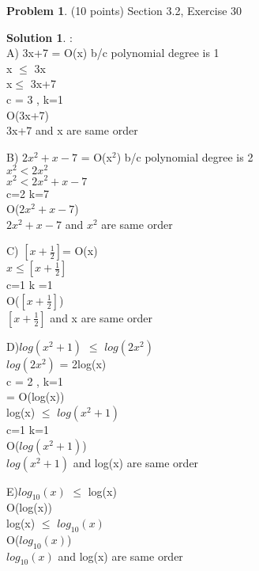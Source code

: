 \documentclass{article}
\theoremstyle{definition}
\newtheorem{problem}{Problem}
\newtheorem*{solution}{Solution}
\begin{document}
\newpage


\begin{problem} (10 points) Section 3.2, Exercise 30
\end{problem}
\begin{solution}:
\\
A) 3x+7 = O(x) b/c polynomial degree is 1
\\
x $\leq$ 3x
\\
x$\leq$ 3x+7
\\
c = 3 , k=1
\\
O(3x+7)
\\
3x+7 and x are same order 

\bigskip
B) $2x^2 + x - 7$ = O(x$^2$) b/c polynomial degree is 2
\\
$x^2 < 2x^2$
\\
$x^2 < 2x^2 + x - 7$
\\
c=2 k=7
\\
O($2x^2+x-7$)
\\
$2x^2+x-7$ and $x^2$ are same order

\bigskip
C) $[x+ \frac{1}{2}] $= O(x)
\\
$x\leq [x+ \frac{1}{2}]$
\\
c=1 k =1 
\\
O($[x+ \frac{1}{2}]$)
\\
$[x+ \frac{1}{2}]$ and x are same order
\\
\bigskip

D)$log(x^2+1)$ $\leq$ $log(2x^2)$
\\
$log(2x^2)$ = 2log(x)
\\
c = 2 ,  k=1
\\
= O(log(x))
\\
log(x) $\leq$ $log(x^2+1)$
\\
c=1 k=1
\\
O($log(x^2+1)$) 
\\ 
$log(x^2+1)$ and log(x) are same order
\bigskip

E)$log_{10}(x)$ $\leq$ log(x)
\\
O(log(x))
\\
log(x) $\leq$ $log_{10}(x)$
\\
O($log_{10}(x)$)
\\
$log_{10}(x)$ and log(x) are same order

\end{solution}

\newpage
\end{document}
